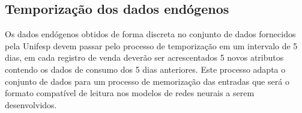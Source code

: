 \documentclass[	12pt, Times, openright, twoside, a4paper, english, brazil]{abntex2}
\begin{document}
	\subsection{Temporização dos dados endógenos}
        Os dados endógenos obtidos de forma discreta no conjunto de dados fornecidos pela Unifesp devem passar pelo processo de temporização em um intervalo de 5 dias, em cada registro de venda deverão ser acrescentados 5 novos atributos contendo os dados de consumo dos 5 dias anteriores. Este processo adapta o conjunto de dados para um processo de memorização das entradas que será o formato compatível de leitura nos modelos de redes neurais a serem desenvolvidos.
        \begin{figure}[H]
	    \end{figure}
	    
\end{document}
